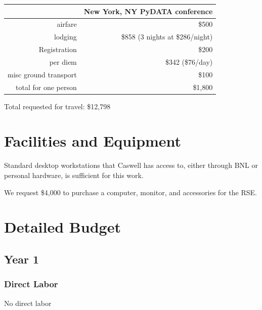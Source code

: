 \documentclass[12pt]{article}
\numberwithin{page}{section}
\begin{document}
\begin{tabular}{|r|r|}
  \hline
  & New York, NY  PyDATA conference\\\hline
  airfare & \$500     \\\hline
  lodging & \$858 (3 nights at \$286/night)     \\\hline
  Registration & \$200     \\\hline
  per diem & \$342 (\$76/day)     \\\hline
  misc ground transport & \$100     \\\hline\hline
  total for one person & \$1,800     \\\hline
\end{tabular}

Total requested for travel: \$12,798

\newpage
\section{Facilities and Equipment}
\setcounter{page}{1}

Standard desktop workstations that Caswell has access to, either
through BNL or personal hardware, is sufficient for this work.

We request \$4,000 to purchase a computer, monitor, and accessories
for the RSE.

\newpage
\section{Detailed Budget}
\setcounter{page}{1}
\subsection{Year 1}
\subsubsection{Direct Labor}
No direct labor
\end{document}

